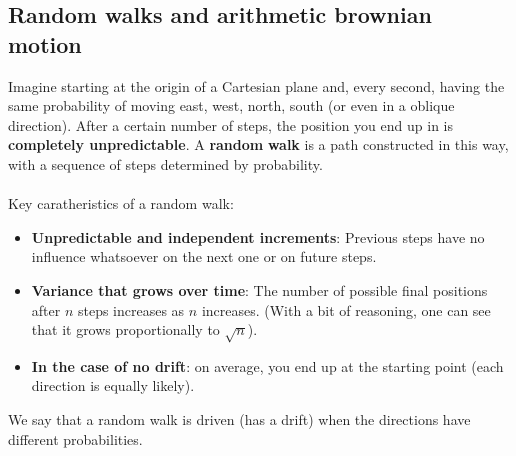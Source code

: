 \subsection{Random walks and arithmetic brownian motion}
Imagine starting at the origin of a Cartesian plane and, every second, having the same probability of moving east, west, north, south (or even in a oblique direction). After a certain number of steps, the position you end up in is \textbf{completely unpredictable}. A \textbf{random} \textbf{walk} is a path constructed in this way, with a sequence of steps determined by probability. \\
\\
Key caratheristics of a random walk:
\begin{itemize}
    \item \textbf{Unpredictable and independent increments}: Previous steps have no influence whatsoever on the next one or on future steps.
    \item \textbf{Variance that grows over time}: The number of possible final positions after $n$ steps increases as $n$ increases. (With a bit of reasoning, one can see that it grows proportionally to $\sqrt{n}$).
    \item \textbf{In the case of no drift}: on average, you end up at the starting point (each direction is equally likely).
\end{itemize}
We say that a random walk is driven (has a drift) when the directions have different probabilities.


